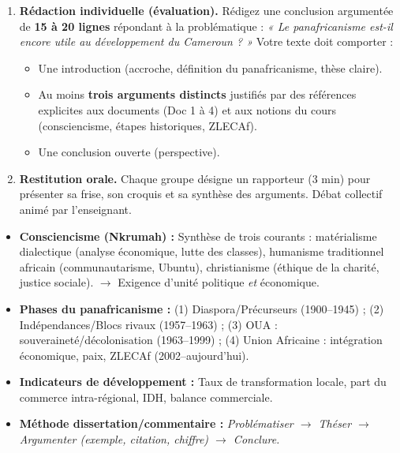 \documentclass[11pt]{article}
\newcommand{\cle}[1]{{\popxbold\color{popdark}#1}}
\newcounter{popsec}
\newcounter{popsub}
\newcommand{\courssub}[1]{%
  \stepcounter{popsub}%
  \par\vspace{9pt}\noindent{\popxbold\fontsize{11.5}{13}\selectfont\color{popink}{\color{poporange}\thepopsec.\thepopsub}\hspace{6pt}#1}\par\nopagebreak\vspace{4pt}
}
\begin{document}
\begin{enumerate}
    \item \textbf{Rédaction individuelle (évaluation).} Rédigez une conclusion argumentée de \textbf{15 à 20 lignes} répondant à la problématique : \emph{« Le panafricanisme est-il encore utile au développement du Cameroun ? »} Votre texte doit comporter :
    \begin{itemize}
        \item Une introduction (accroche, définition du panafricanisme, thèse claire).
        \item Au moins \textbf{trois arguments distincts} justifiés par des références explicites aux documents (Doc 1 à 4) et aux notions du cours (consciencisme, étapes historiques, ZLECAf).
        \item Une conclusion ouverte (perspective).
    \end{itemize}
    
    \item \textbf{Restitution orale.} Chaque groupe désigne un rapporteur (3 min) pour présenter sa frise, son croquis et sa synthèse des arguments. Débat collectif animé par l'enseignant.
\end{enumerate}

\courssub{Ressources à mobiliser}
\begin{itemize}
    \item \textbf{Consciencisme (Nkrumah) :} Synthèse de trois courants : \cle{matérialisme dialectique} (analyse économique, lutte des classes), \cle{humanisme traditionnel africain} (communautarisme, Ubuntu), \cle{christianisme} (éthique de la charité, justice sociale). $\rightarrow$ Exigence d'unité politique \emph{et} économique.
    \item \textbf{Phases du panafricanisme :} (1) Diaspora/Précurseurs (1900--1945) ; (2) Indépendances/Blocs rivaux (1957--1963) ; (3) OUA : souveraineté/décolonisation (1963--1999) ; (4) Union Africaine : intégration économique, paix, ZLECAf (2002--aujourd'hui).
    \item \textbf{Indicateurs de développement :} Taux de transformation locale, part du commerce intra-régional, IDH, balance commerciale.
    \item \textbf{Méthode dissertation/commentaire :} \emph{Problématiser $\rightarrow$ Théser $\rightarrow$ Argumenter (exemple, citation, chiffre) $\rightarrow$ Conclure.}
\end{itemize}
\end{document}
